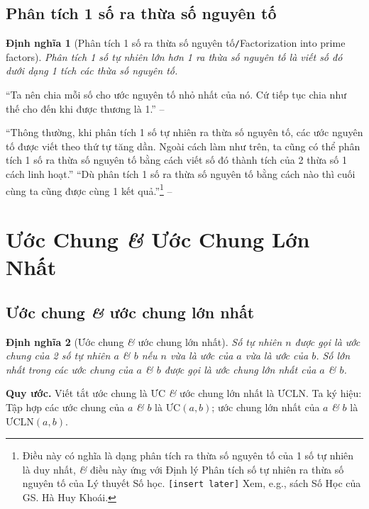 \documentclass[oneside]{book}
\numberwithin{equation}{section}
\newtheorem{dinhnghia}{Định nghĩa}[section]
\begin{document}
\subsection{Phân tích 1 số ra thừa số nguyên tố}

\begin{dinhnghia}[Phân tích 1 số ra thừa số nguyên tố\texttt{/}Factorization into prime factors]
	\emph{Phân tích 1 số tự nhiên lớn hơn 1 ra thừa số nguyên tố} là viết số đó dưới dạng 1 tích các thừa số nguyên tố.
\end{dinhnghia}
``Ta nên chia mỗi số cho ước nguyên tố nhỏ nhất của nó. Cứ tiếp tục chia như thế cho đến khi được thương là 1.'' -- \cite[p. 45]{Thai_Anh_Dat_Ha_Loan_Nam_Quang_Toan_6_tap_1}

``Thông thường, khi phân tích 1 số tự nhiên ra thừa số nguyên tố, các ước nguyên tố được viết theo thứ tự tăng dần. Ngoài cách làm như trên, ta cũng có thể phân tích 1 số ra thừa số nguyên tố bằng cách viết số đó thành tích của 2 thừa số 1 cách linh hoạt.'' ``Dù phân tích 1 số ra thừa số nguyên tố bằng cách nào thì cuối cùng ta cũng được cùng 1 kết quả.''\footnote{Điều này có nghĩa là dạng phân tích ra thừa số nguyên tố của 1 số tự nhiên là duy nhất, \textit{\&} điều này ứng với Định lý Phân tích số tự nhiên ra thừa số nguyên tố của Lý thuyết Số học. \texttt{[insert later]} Xem, e.g., sách Số Học của GS. Hà Huy Khoái.} -- \cite[p. 46]{Thai_Anh_Dat_Ha_Loan_Nam_Quang_Toan_6_tap_1}

\section{Ước Chung \textit{\&} Ước Chung Lớn Nhất}

\subsection{Ước chung \textit{\&} ước chung lớn nhất}

\begin{dinhnghia}[Ước chung \textit{\&} ước chung lớn nhất]
	Số tự nhiên $n$ được gọi là \emph{ước chung} của 2 số tự nhiên $a$ \textit{\&} $b$ nếu $n$ vừa là ước của $a$ vừa là ước của $b$. Số lớn nhất trong các ước chung của $a$ \textit{\&} $b$ được gọi là \emph{ước chung lớn nhất} của $a$ \textit{\&} $b$.
\end{dinhnghia}
\noindent\textbf{Quy ước.} Viết tắt ước chung là ƯC \textit{\&} ước chung lớn nhất là ƯCLN. Ta ký hiệu: Tập hợp các ước chung của $a$ \textit{\&} $b$ là $\mbox{ƯC}(a,b)$; ước chung lớn nhất của $a$ \textit{\&} $b$ là $\mbox{ƯCLN}(a,b)$.
\end{document}
